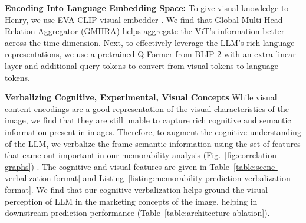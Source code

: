 \textbf{Encoding Into Language Embedding Space:} To give visual knowledge to Henry, we use EVA-CLIP visual embedder \cite{sun2023eva}. We find that Global Multi-Head Relation Aggregator (GMHRA) \cite{li2021uniformer} helps aggregate the ViT's information better across the time dimension. Next, to effectively leverage the LLM's rich language representations, we use a pretrained Q-Former from BLIP-2 \cite{li2023blip} with an extra linear layer and additional query tokens to convert from visual tokens to language tokens.






\textbf{Verbalizing Cognitive, Experimental, Visual Concepts}
\label{sec:Verbalizing Visual Content}
While visual content encodings are a good representation of the visual characteristics of the image, we find that they are still unable to capture rich cognitive and semantic information present in images. Therefore, to augment the cognitive understanding of the LLM, we verbalize the frame semantic information using the set of features that came out important in our memorability analysis (Fig.~\ref{fig:correlation-graphs}) \cite{bhattacharya2023video,singh2024llava}. The cognitive and visual features are given in Table~\ref{table:scene-verbalization-format} and Listing~\ref{listing:memorability-prediction-verbalization-format}. We find that our cognitive verbalization helps ground the visual perception of LLM in the marketing concepts of the image, helping in downstream prediction performance (Table~\ref{table:architecture-ablation}). %






